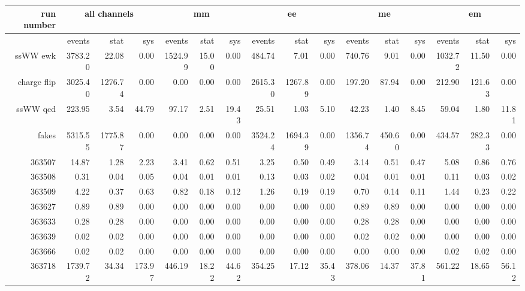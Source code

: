 \begin{sidewaystable}[!htbp]
  {\scriptsize
    \begin{tabular}{r|rrr|rrr|rrr|rrr|rrr}
      run number&\multicolumn{3}{c|}{all channels}&\multicolumn{3}{c|}{mm}&\multicolumn{3}{c|}{ee}&\multicolumn{3}{c|}{me}&\multicolumn{3}{c}{em}\\
      \hline
      &events&stat&sys&events&stat&sys&events&stat&sys&events&stat&sys&events&stat&sys\\
      \hline\hline
      ssWW ewk&3783.20&22.08&0.00&1524.99&15.00&0.00&484.74&7.01&0.00&740.76&9.01&0.00&1032.72&11.50&0.00\\
      
      charge flip&3025.40&1276.74&0.00&0.00&0.00&0.00&2615.30&1267.89&0.00&197.20&87.94&0.00&212.90&121.63&0.00\\
      
      ssWW qcd&223.95&3.54&44.79&97.17&2.51&19.43&25.51&1.03&5.10&42.23&1.40&8.45&59.04&1.80&11.81\\
      
      fakes&5315.55&1775.87&0.00&0.00&0.00&0.00&3524.24&1694.39&0.00&1356.74&450.60&0.00&434.57&282.33&0.00\\
      
      363507&14.87&1.28&2.23&3.41&0.62&0.51&3.25&0.50&0.49&3.14&0.51&0.47&5.08&0.86&0.76\\
      
      363508&0.31&0.04&0.05&0.04&0.01&0.01&0.13&0.03&0.02&0.04&0.01&0.01&0.11&0.03&0.02\\
      
      363509&4.22&0.37&0.63&0.82&0.18&0.12&1.26&0.19&0.19&0.70&0.14&0.11&1.44&0.23&0.22\\
      
      363627&0.89&0.89&0.00&0.00&0.00&0.00&0.00&0.00&0.00&0.89&0.89&0.00&0.00&0.00&0.00\\
      
      363633&0.28&0.28&0.00&0.00&0.00&0.00&0.00&0.00&0.00&0.28&0.28&0.00&0.00&0.00&0.00\\
      
      363639&0.02&0.02&0.00&0.00&0.00&0.00&0.00&0.00&0.00&0.02&0.02&0.00&0.00&0.00&0.00\\
      
      363666&0.02&0.02&0.00&0.00&0.00&0.00&0.00&0.00&0.00&0.00&0.00&0.00&0.02&0.02&0.00\\
      
      363718&1739.72&34.34&173.97&446.19&18.22&44.62&354.25&17.12&35.43&378.06&14.37&37.81&561.22&18.65&56.12\\
      

\end{tabular}}
\end{sidewaystable}
